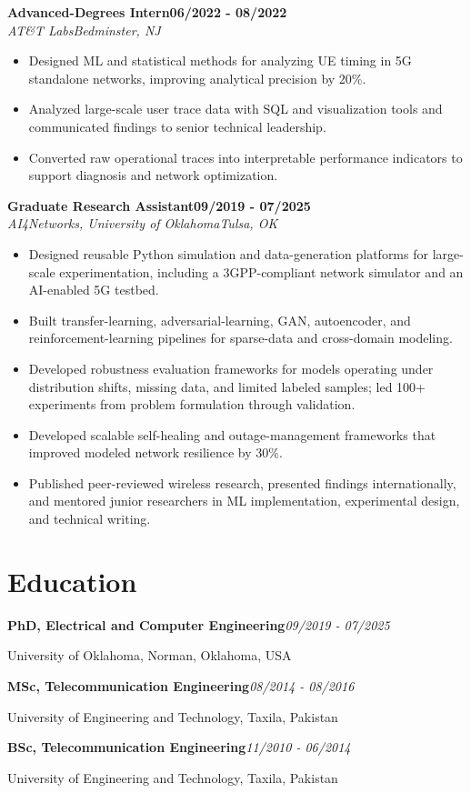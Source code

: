 \documentclass[9pt,letterpaper]{extarticle}
\newcommand{\role}[4]{%
  \Needspace{4\baselineskip}\textbf{#1}\hfill\textbf{#2}\\[-1pt]
  \textit{#3}\hfill\textit{#4}\par}
\newcommand{\entry}[2]{\Needspace{4\baselineskip}\textbf{#1}\hfill\textit{#2}\par}
\begin{document}
\role{Advanced-Degrees Intern}{06/2022 - 08/2022}{AT\&T Labs}{Bedminster, NJ}
\begin{itemize}
\item Designed ML and statistical methods for analyzing UE timing in 5G standalone networks, improving analytical precision by 20\%.
\item Analyzed large-scale user trace data with SQL and visualization tools and communicated findings to senior technical leadership.
\item Converted raw operational traces into interpretable performance indicators to support diagnosis and network optimization.
\end{itemize}
\role{Graduate Research Assistant}{09/2019 - 07/2025}{AI4Networks, University of Oklahoma}{Tulsa, OK}
\begin{itemize}
\item Designed reusable Python simulation and data-generation platforms for large-scale experimentation, including a 3GPP-compliant network simulator and an AI-enabled 5G testbed.
\item Built transfer-learning, adversarial-learning, GAN, autoencoder, and reinforcement-learning pipelines for sparse-data and cross-domain modeling.
\item Developed robustness evaluation frameworks for models operating under distribution shifts, missing data, and limited labeled samples; led 100+ experiments from problem formulation through validation.
\item Developed scalable self-healing and outage-management frameworks that improved modeled network resilience by 30\%.
\item Published peer-reviewed wireless research, presented findings internationally, and mentored junior researchers in ML implementation, experimental design, and technical writing.
\end{itemize}
\section{Education}
\entry{PhD, Electrical and Computer Engineering}{09/2019 - 07/2025}
University of Oklahoma, Norman, Oklahoma, USA\par
\entry{MSc, Telecommunication Engineering}{08/2014 - 08/2016}
University of Engineering and Technology, Taxila, Pakistan\par
\entry{BSc, Telecommunication Engineering}{11/2010 - 06/2014}
University of Engineering and Technology, Taxila, Pakistan\par
{}
\end{document}
